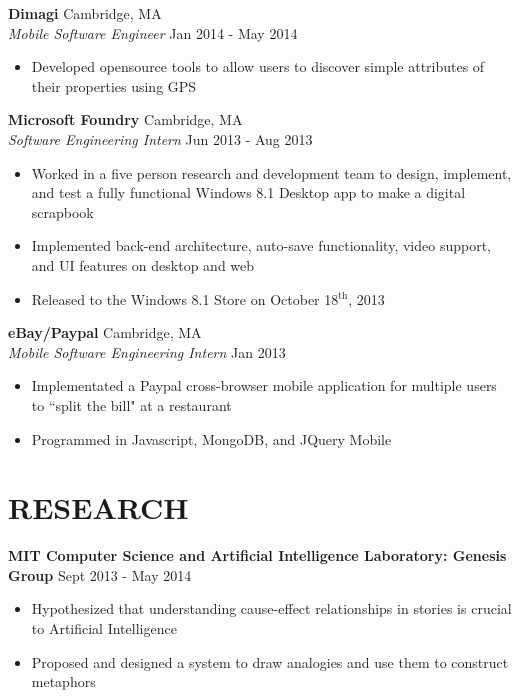 \documentclass{res}
\begin{document}
\begin{resume}
	{\bf Dimagi} \hfill Cambridge, MA \\
	{\em Mobile Software Engineer} \hfill Jan 2014 - May 2014
	\begin{itemize}  \itemsep -3pt %
	\item Developed opensource tools to allow users to discover simple attributes of their properties using GPS
           \end{itemize}

	{\bf Microsoft Foundry} \hfill Cambridge, MA \\
	{\em Software Engineering Intern} \hfill Jun 2013 - Aug 2013
	\begin{itemize}  \itemsep -3pt %
	\item Worked in a five person research and development team to design, implement, and test a fully functional Windows 8.1 Desktop app to make a digital scrapbook
	\item Implemented back-end architecture, auto-save functionality, video support, and UI features on desktop and web
	\item Released to the Windows 8.1 Store on October 18$\mathrm{^{th}}$, 2013
           \end{itemize}

	{\bf eBay/Paypal} \hfill Cambridge, MA \\
	{\em Mobile Software Engineering Intern} \hfill Jan 2013
	\begin{itemize}  \itemsep -3pt %
	\item Implementated a Paypal cross-browser mobile application for multiple users to ``split the bill" at a restaurant
	\item Programmed in Javascript, MongoDB, and JQuery Mobile
           \end{itemize}

\section{\large RESEARCH}
	{\bf MIT Computer Science and Artificial Intelligence Laboratory: Genesis Group} \hfill Sept 2013 - May 2014
	\begin{itemize} \itemsep -3pt
	\item Hypothesized that understanding cause-effect relationships in stories is crucial to Artificial Intelligence
	\item Proposed and designed a system to draw analogies and use them to construct metaphors
	\end{itemize}


\end{resume}
\end{document}
